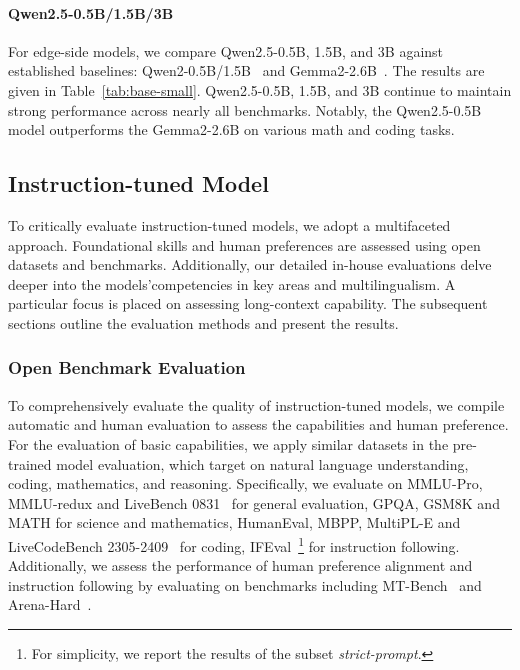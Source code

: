 \documentclass{article}
\begin{document}
\paragraph{Qwen2.5-0.5B/1.5B/3B}
For edge-side models, we compare Qwen2.5-0.5B, 1.5B, and 3B against established baselines: Qwen2-0.5B/1.5B~\citep{qwen2} and Gemma2-2.6B~\citep{gemma2}. The results are given in Table~\ref{tab:base-small}. Qwen2.5-0.5B, 1.5B, and 3B continue to maintain strong performance across nearly all benchmarks. Notably, the Qwen2.5-0.5B model outperforms the Gemma2-2.6B on various math and coding tasks.

\subsection{Instruction-tuned Model}

To critically evaluate instruction-tuned models, we adopt a multifaceted approach. 
Foundational skills and human preferences are assessed using open datasets and benchmarks. 
Additionally, our detailed in-house evaluations delve deeper into the models'competencies in key areas and multilingualism. 
A particular focus is placed on assessing long-context capability.
The subsequent sections outline the evaluation methods and present the results.

\subsubsection{Open Benchmark Evaluation}

To comprehensively evaluate the quality of instruction-tuned models, we compile automatic and human evaluation to assess the capabilities and human preference. 
For the evaluation of basic capabilities, we apply similar datasets in the pre-trained model evaluation, which target on natural language understanding, coding, mathematics, and reasoning. 
Specifically, we evaluate on MMLU-Pro, MMLU-redux and LiveBench 0831~\citep{livebench} for general evaluation, GPQA, GSM8K and MATH for science and mathematics, HumanEval, MBPP, MultiPL-E and LiveCodeBench 2305-2409~\citep{livecodebench} for coding, 
IFEval~\citep{ifeval}\footnote{For simplicity, we report the results of the subset \textit{strict-prompt}.} for instruction following.
Additionally, we assess the performance of human preference alignment and instruction following by evaluating on benchmarks including MT-Bench~\citep{mtbench} and Arena-Hard~\citep{arena-hard}.
\end{document}

